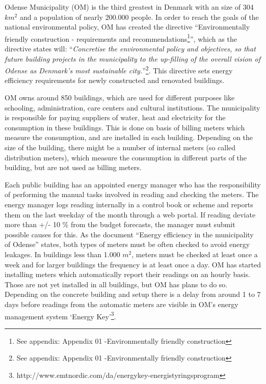 Odense Municipality (OM) is the third greatest in Denmark with an size of 304 $km^2$ and a population of nearly 200.000 people. In order to reach the goals of the national environmental policy, OM has created the directive “Environmentally friendly construction - requirements and recommendations\footnote{See appendix: Appendix 01 -Environmentally friendly construction}”,  which as the directive states will: “\emph{Concretise the environmental policy and objectives, so that future building projects in the municipality  to the up-filling of the overall vision of Odense as Denmark's most sustainable city.}”\footnote{See appendix: Appendix 01 -Environmentally friendly construction}. This directive sets energy efficiency requirements for newly constructed and renovated buildings.

OM owns around 850 buildings, which are used for different purposes like schooling, administration, care centers and cultural institutions. The municipality is responsible for paying suppliers of water, heat and electricity for the consumption in these buildings. This is done on basis of billing meters which measure the consumption, and are installed in each building. Depending on the size of the building, there might be a number of internal meters (so called distribution meters), which measure the consumption in different parts of the building, but are not used as billing meters. 

Each public building has an appointed energy manager who has the responsibility of performing the manual tasks involved in reading and checking the meters. The energy manager logs reading internally in a control book or scheme and reports them on the last weekday of the month through a web portal. If reading deviate more than +/- 10 \% from the budget forecasts, the manager must submit possible causes for this. As the document “Energy efficiency in the municipality of Odense” states, both types of meters must be often checked to avoid energy leakages.  In buildings less than 1.000 $m^2$, meters must be checked at least once a week and for larger buildings the frequency is at least once a day. OM has started installing meters which automatically report their readings on an hourly basis. Those are not yet installed in all buildings, but OM has plans to do so. Depending on the concrete building and setup there is a delay from around 1 to 7 days before readings from the automatic meters are visible in OM’s energy management system ‘Energy Key’\footnote{http://www.emtnordic.com/da/energykey-energistyringsprogram}.

